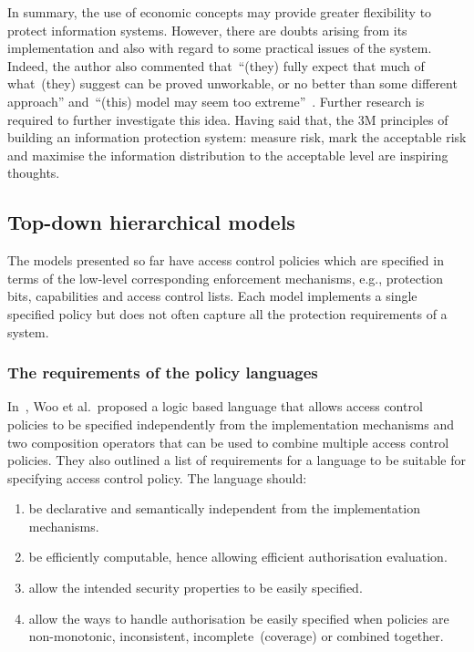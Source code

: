 In summary, the use of economic concepts may provide greater
flexibility to protect information systems. However, there are doubts
arising from its implementation and also with regard to some practical
issues of the system. Indeed, the author also commented that~``(they)
fully expect that much of what~(they) suggest can be proved
unworkable, or no better than some different approach'' and~``(this)
model may seem too extreme''~\cite{JPO04}. Further research is
required to further investigate this idea. Having said that, the $3$M
principles of building an information protection system: measure risk,
mark the acceptable risk and maximise the information distribution to
the acceptable level are inspiring thoughts.

\subsection{Top-down hierarchical models}
\label{TopDownHierarchicalPolicyModel}
The models presented so far have access control policies which are
specified in terms of the low-level corresponding enforcement
mechanisms, e.g., protection bits, capabilities and access control
lists. Each model implements a single specified policy but does not
often capture all the protection requirements of a system.

\subsubsection{The requirements of the policy languages}
In~\cite{TYCW92}, Woo et al.\ proposed a logic based language that
allows access control policies to be specified independently from the
implementation mechanisms and two composition operators that can be
used to combine multiple access control policies. They also outlined a
list of requirements for a language to be suitable for specifying
access control policy. The language should:
\begin{enumerate}
\item be declarative and semantically independent from the
  implementation mechanisms.
\item be efficiently computable, hence allowing efficient
  authorisation evaluation.
\item allow the intended security properties to be easily specified.
\item allow the ways to handle authorisation be easily specified when
  policies are non-monotonic, inconsistent, incomplete~(coverage) or
  combined together.
\end{enumerate}

